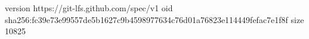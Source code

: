 version https://git-lfs.github.com/spec/v1
oid sha256:fc39e73e99557de5b1627c9b4598977634c76d01a76823e114449fefac7e1f8f
size 10825
